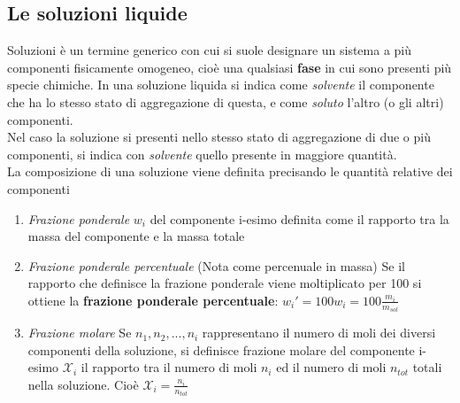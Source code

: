 \documentclass{article}
\begin{document}
\subsection{Le soluzioni liquide}
Soluzioni è un termine generico con cui si suole designare un sistema a più componenti fisicamente omogeneo, cioè una 
qualsiasi \textbf{fase} in cui sono presenti più specie chimiche. In una soluzione liquida si indica come \textit{solvente}
il componente che ha lo stesso stato di aggregazione di questa, e come \textit{soluto} l'altro (o gli altri) componenti.
\\
Nel caso la soluzione si presenti nello stesso stato di aggregazione di due o più componenti, si indica con
\textit{solvente} quello presente in maggiore quantità.\\
La composizione di una soluzione viene definita precisando le quantità relative dei componenti 
\begin{enumerate}
    \item \textit{Frazione ponderale} $w_i$ del componente i-esimo definita come il rapporto tra la massa del componente e la massa totale
    \item \textit{Frazione ponderale percentuale} (Nota come percenuale in massa) Se il rapporto che definisce la frazione ponderale
    viene moltiplicato per 100 si ottiene la \textbf{frazione ponderale percentuale}: $w_i'=100w_i=100\frac{m_i}{m_{sol}}$
    \item \textit{Frazione molare} Se $n_1,n_2,...,n_i$ rappresentano il numero di moli dei diversi componenti
    della soluzione, si definisce frazione molare del componente i-esimo $\mathcal{X}_i$ il rapporto tra il numero di moli $n_i$
    ed il numero di moli $n_{tot}$ totali nella soluzione. Cioè $\mathcal{X}_i = \frac{n_i}{n_{tot}}$
\end{enumerate}
\end{document}
